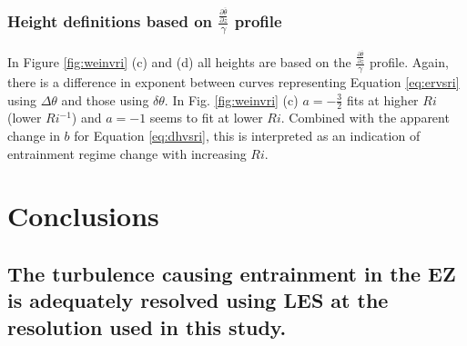 \subsubsection{Height definitions based on $\frac{\frac{\partial \overline{\theta}}{\partial z}}{\gamma}$ profile}
In Figure \ref{fig:weinvri} (c) and (d) all heights are based on the $\frac{\frac{\partial \overline{\theta}}{\partial z}}{\gamma}$ profile.  Again, there is a difference in exponent between curves representing Equation \ref{eq:ervsri} using $\Delta \theta$ and those using $\delta \theta$.  In Fig. \ref{fig:weinvri} (c) $a=-\frac{3}{2}$ fits at higher $Ri$ (lower $Ri^{-1}$) and $a=-1$ seems to fit at lower $Ri$.  Combined with the apparent change in $b$ for Equation \ref{eq:dhvsri}, this is interpreted as an indication of entrainment regime change with increasing $Ri$.\\ 


\section{Conclusions}
\subsection{The turbulence causing entrainment in the EZ is adequately resolved using LES at the resolution used in this study.}

